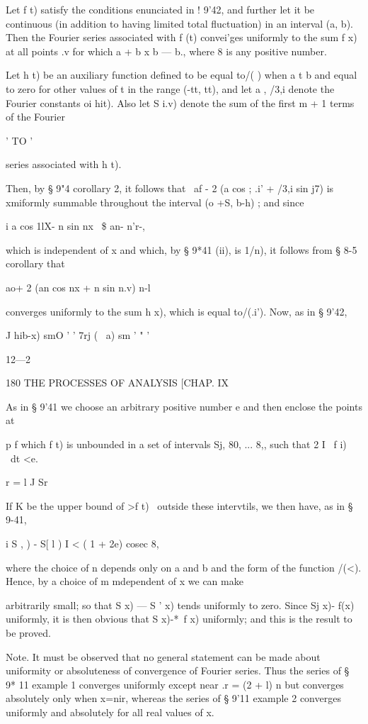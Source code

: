Let f t) satisfy the conditions enunciated in ! 9'42, and further let
it be continuous (in addition to having limited total fluctuation) in
an interval (a, b). Then the Fourier series associated with f (t)
convei'ges uniformly to the sum f x) at all points .v for which a + b
x b — b., where 8 is any positive number.

Let h t) be an auxiliary function defined to be equal to/( ) when a t
b and equal to zero for other values of t in the range (-tt, tt), and
let a , /3,i denote the Fourier constants oi hit). Also let S i.v)
denote the sum of the first m + 1 terms of the Fourier

  ' TO '

series associated with h t).

Then, by § 9"4 corollary 2, it follows that \ af - 2 (a cos ; .i' +
/3,i sin j7) is xmiformly summable throughout the interval (o +S, b-h)
; and since

i a cos 1lX- n sin nx \ \$ an- n'r-,

which is independent of x and which, by § 9*41 (ii), is 1/n), it
follows from § 8-5 corollary that

 ao+ 2 (an cos nx + n sin n.v) n-l

converges uniformly to the sum h x), which is equal to/(.i'). Now, as
in § 9'42,

   J hib-x) smO ' ' 7rj ( \ a) sm ' " '

12—2

180 THE PROCESSES OF ANALYSIS [CHAP. IX

As in § 9'41 we choose an arbitrary positive number e and then enclose
the points at

p f which f t) is unbounded in a set of intervals Sj, 80, ... 8,, such
that 2 I \ f i) \ dt <e.

r = l J Sr

If K be the upper bound of >f t) \ outside these intervtils, we then
have, as in § 9-41,

i S , ) - S[ l ) I < ( 1 + 2e) cosec 8,

where the choice of n depends only on a and b and the form of the
function /(<). Hence, by a choice of m mdependent of x we can make

arbitrarily small; so that S x) — S ' x) tends uniformly to zero.
Since Sj x)- f(x) uniformly, it is then obvious that S x)-*~f x)
uniformly; and this is the result to be proved.

Note. It must be observed that no general statement can be made about
uniformity or absoluteness of convergence of Fourier series. Thus the
series of § 9* 11 example 1 converges uniformly except near .r = (2 +
l) n but converges absolutely only when x=nir, whereas the series of §
9'11 example 2 converges uniformly and absolutely for all real values
of x.

